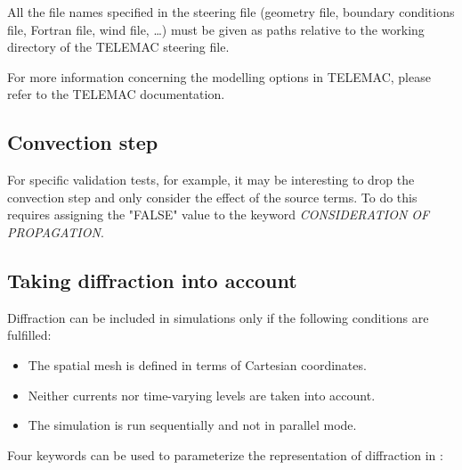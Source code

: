 All the file names specified in the \tomawac steering file (geometry file, boundary conditions file, Fortran file, wind file, \dots ) must be given as paths relative to the working directory of the TELEMAC steering file.

 For more information concerning the modelling options in TELEMAC, please refer to the TELEMAC documentation.

\subsection{ Convection step}

 For specific validation tests, for example, it may be interesting to drop the convection step and only consider the effect of the source terms. To do this requires assigning the "FALSE" value to the keyword \textit{CONSIDERATION OF PROPAGATION}.


\subsection{ Taking diffraction into account}

 Diffraction can be included in \tomawac simulations only if the following conditions are fulfilled:
\begin{itemize}

\item The spatial mesh is defined in terms of Cartesian coordinates.

 \item Neither currents nor time-varying levels are taken into account.

 \item The simulation is run sequentially and not in parallel mode.
\end{itemize}

Four keywords can be used to parameterize the representation of diffraction in \tomawac:

